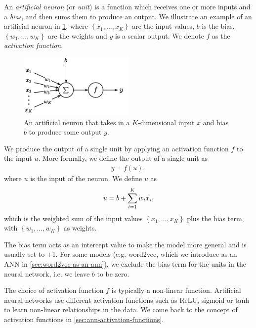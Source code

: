 An \textit{artificial neuron} (or \textit{unit}) is a function which receives one or more inputs and a \textit{bias}, and then sums them to produce an output. We illustrate an example of an artificial neuron in \cref{fig:artificial_neuron}, where $\left\{ x_1, \ldots, x_K \right\}$ are the input values, $b$ is the bias, $\left\{ w_1, \ldots, w_K \right\}$ are the weights and $y$ is a scalar output. We denote $f$ as the \textit{activation function}.
\begin{figure}[H]
    \centering
    \includegraphics[width=0.5\textwidth]{thesis/figures/artificial-neuron_cropped.pdf}
    \caption{An artificial neuron that takes in a $K$-dimensional input $x$ and bias $b$ to produce some output $y$.}
    \label{fig:artificial_neuron}
\end{figure}

We produce the output of a single unit by applying an activation function $f$ to the input $u$. More formally, we define the output of a single unit as
\begin{align}
    y = f(u),
\end{align}
where $u$ is the input of the neuron. We define $u$ as
\begin{align}
    u = b + \sum\limits_{i=1}^{K} w_i x_i,
\end{align}
which is the weighted sum of the input values $\left\{ x_1, \ldots, x_K \right\}$ plus the bias term, with $\left\{ w_1, \ldots, w_K \right\}$ as weights.

The bias term acts as an intercept value to make the model more general and is usually set to +1. For some models (e.g. word2vec, which we introduce as an ANN in \cref{sec:word2vec-as-an-ann}), we exclude the bias term for the units in the neural network, i.e. we leave $b$ to be zero.

The choice of activation function $f$ is typically a non-linear function. Artificial neural networks use different activation functions such as ReLU, sigmoid or tanh to learn non-linear relationships in the data. We come back to the concept of activation functions in \cref{sec:ann-activation-functions}.

\newcommand{\layer}[2]{\left\{ {#1}_{#2} \right\}}

